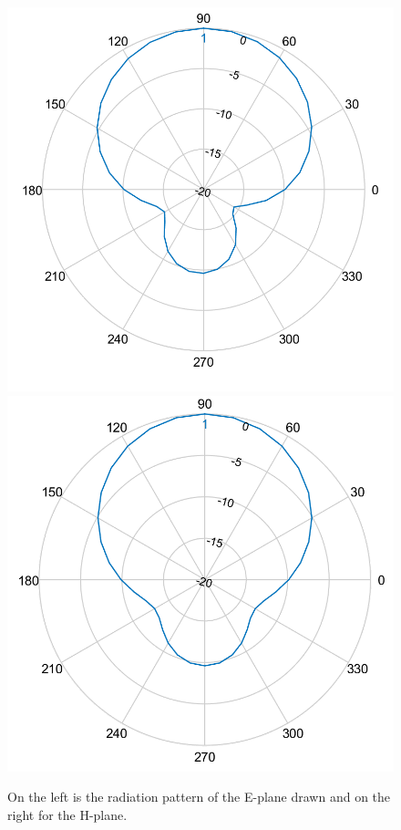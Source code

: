 \documentclass[twocolumn]{phdsymp} %
\begin{document}
\begin{figure}[!htb]
  \includegraphics[width=\linewidth]{pattern2/ep.png} 
\endminipage\hfill
{}%
  \includegraphics[width=\linewidth]{pattern2/hp.png}
\endminipage
  \caption{On the left is the radiation pattern of the E-plane drawn and on the right for the H-plane.}
\label{fig:radpattern}
\end{figure}
\end{document}
